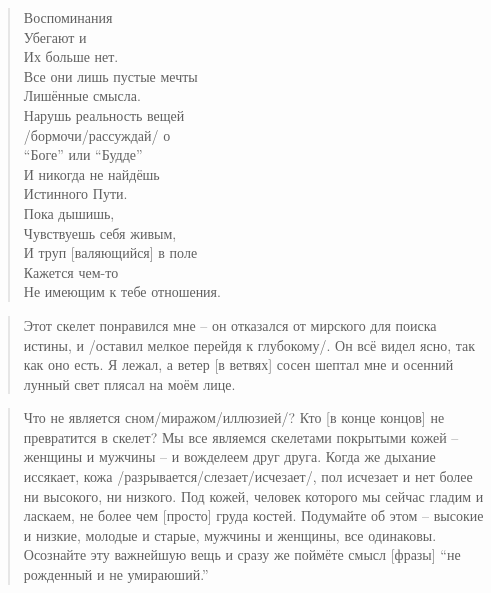 \begin{ver}
\begin{quote}
  \begin{verses}
  Воспоминания\\
  Убегают и\\
  Их больше нет.\\
  Все они лишь пустые мечты\\
  Лишённые смысла.\\

  Нарушь реальность вещей\\
  /бормочи/рассуждай/ о\\
  ``Боге'' или ``Будде''\\
  И никогда не найдёшь\\
  Истинного Пути.\\
  
  Пока дышишь,\\
  Чувствуешь себя живым,\\
  И труп [валяющийся] в поле\\
  Кажется чем-то\\
  Не имеющим к тебе отношения.
  \end{verses}
\end{quote}
\end{ver}

\begin{ver}
  \begin{quote}
    Этот скелет понравился мне -- он отказался от мирского для поиска
    истины, и /оставил мелкое перейдя к глубокому/. Он всё видел ясно,
    так как оно есть. Я лежал, а ветер [в ветвях] сосен шептал мне и
    осенний лунный свет плясал на моём лице. 
  \end{quote}
\end{ver}

\begin{ver}
  \begin{quote}
    Что не является сном/миражом/иллюзией/? Кто [в конце концов] не
    превратится в скелет?
    Мы все являемся скелетами покрытыми кожей -- женщины и мужчины --
    и вожделеем друг друга. Когда же дыхание иссякает, кожа
    /разрывается/слезает/исчезает/, пол исчезает и нет
    более ни высокого, ни низкого. Под кожей, человек которого мы
    сейчас гладим и ласкаем, не более чем [просто] груда
    костей. Подумайте об этом -- высокие и низкие, молодые и старые,
    мужчины и женщины, все одинаковы. 
    Осознайте эту важнейшую вещь и сразу же поймёте смысл [фразы] ``не
    рожденный и не умираюший.''
  \end{quote}
\end{ver}

